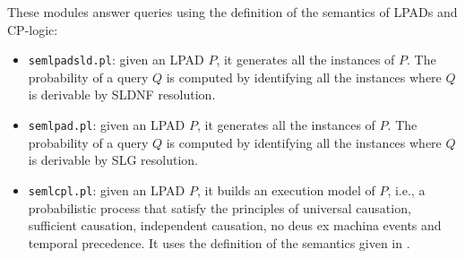 \documentclass[a4paper,10pt]{scrartcl}
\begin{document}
These modules answer queries using the definition of the semantics of LPADs and CP-logic:
\begin{itemize}
\item \texttt{semlpadsld.pl}: given an LPAD $P$, it generates all the instances of $P$. The probability of a query $Q$ is computed by identifying all the instances where $Q$ is derivable by SLDNF resolution.
\item \texttt{semlpad.pl}: given an LPAD $P$, it generates all  the instances of $P$. The probability of a query $Q$ is computed by identifying all the instances where $Q$ is derivable by SLG resolution.
\item \texttt{semlcpl.pl}: given an LPAD $P$,  it builds an execution model of $P$, i.e., a probabilistic process that satisfy the principles of universal causation, sufficient causation, independent causation, no deus ex machina events and temporal precedence. It uses the definition of the semantics given in \cite{DBLP:journals/tplp/VennekensDB09}.
\end{itemize}
\end{document}
